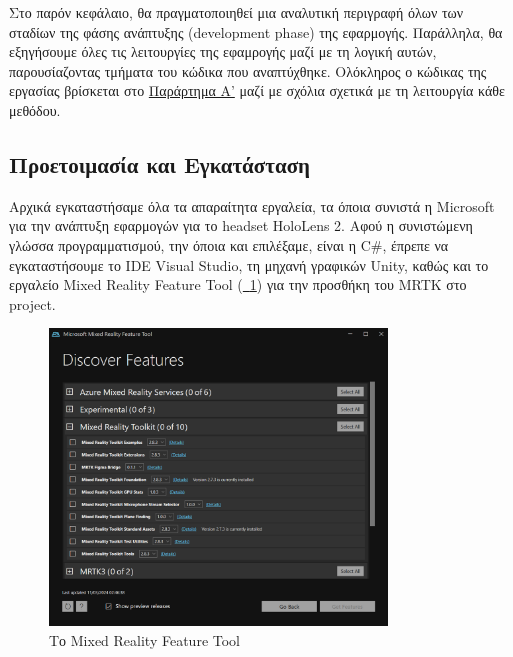 
Στο παρόν κεφάλαιο, θα πραγματοποιηθεί μια αναλυτική περιγραφή όλων των σταδίων της φάσης ανάπτυξης (development phase) της εφαρμογής. Παράλληλα, θα εξηγήσουμε όλες τις λειτουργίες της εφαμρογής μαζί με τη λογική αυτών, παρουσίαζοντας τμήματα του κώδικα που αναπτύχθηκε.
Ολόκληρος ο κώδικας της εργασίας βρίσκεται στο \hyperref[ch:appendixA]{Παράρτημα Α'} μαζί με σχόλια σχετικά με τη λειτουργία κάθε μεθόδου.

\subsection{Προετοιμασία και Εγκατάσταση}\label{subsec:developSetup}

Αρχικά εγκαταστήσαμε όλα τα απαραίτητα εργαλεία, τα όποια συνιστά η Microsoft για την ανάπτυξη εφαρμογών για το headset HoloLens 2. Αφού η συνιστώμενη γλώσσα προγραμματισμού, την όποια και επιλέξαμε, είναι η C\#, έπρεπε να εγκαταστήσουμε το IDE Visual Studio, τη μηχανή γραφικών Unity, καθώς και το εργαλείο Mixed Reality Feature Tool (\hyperref[fig:mrft]{\schema~\ref*{fig:mrft}}) για την προσθήκη του MRTK στο project.

\begin{figure}[!h]
    \centering
    \includegraphics[width=0.8\textwidth]{images/mixed_reality_feature_tool.png}
    \caption{Το Mixed Reality Feature Tool}\label{fig:mrft}
\end{figure}

